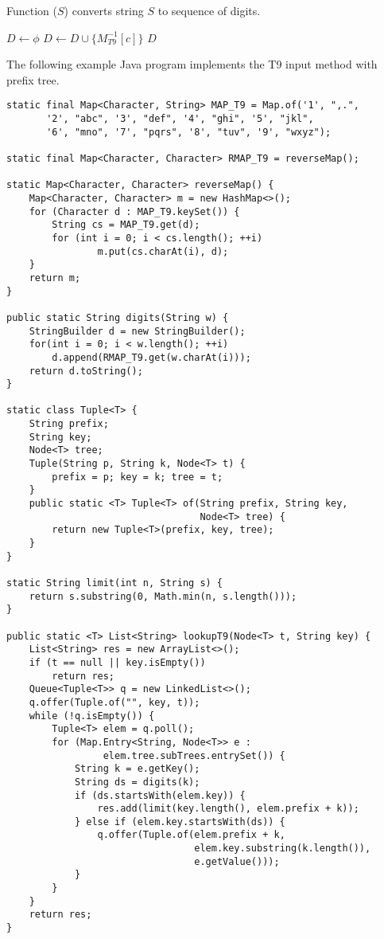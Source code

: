 \documentclass{article}
\begin{document}
Function ($S$) converts string $S$ to sequence of digits.

\begin{algorithmic}[1]
  \State $D \gets \phi$
    \State $D \gets D \cup \{M^{-1}_{T9}[c]\}$
  \EndFor
  \State \Return $D$
\EndFunction
\end{algorithmic}

The following example Java program implements the T9 input method with prefix tree.

\lstset{language=Java}
\begin{lstlisting}
static final Map<Character, String> MAP_T9 = Map.of('1', ",.",
       '2', "abc", '3', "def", '4', "ghi", '5', "jkl",
       '6', "mno", '7', "pqrs", '8', "tuv", '9', "wxyz");

static final Map<Character, Character> RMAP_T9 = reverseMap();

static Map<Character, Character> reverseMap() {
    Map<Character, Character> m = new HashMap<>();
    for (Character d : MAP_T9.keySet()) {
        String cs = MAP_T9.get(d);
        for (int i = 0; i < cs.length(); ++i)
                m.put(cs.charAt(i), d);
    }
    return m;
}

public static String digits(String w) {
    StringBuilder d = new StringBuilder();
    for(int i = 0; i < w.length(); ++i)
        d.append(RMAP_T9.get(w.charAt(i)));
    return d.toString();
}

static class Tuple<T> {
    String prefix;
    String key;
    Node<T> tree;
    Tuple(String p, String k, Node<T> t) {
        prefix = p; key = k; tree = t;
    }
    public static <T> Tuple<T> of(String prefix, String key,
                                  Node<T> tree) {
        return new Tuple<T>(prefix, key, tree);
    }
}

static String limit(int n, String s) {
    return s.substring(0, Math.min(n, s.length()));
}

public static <T> List<String> lookupT9(Node<T> t, String key) {
    List<String> res = new ArrayList<>();
    if (t == null || key.isEmpty())
        return res;
    Queue<Tuple<T>> q = new LinkedList<>();
    q.offer(Tuple.of("", key, t));
    while (!q.isEmpty()) {
        Tuple<T> elem = q.poll();
        for (Map.Entry<String, Node<T>> e :
                 elem.tree.subTrees.entrySet()) {
            String k = e.getKey();
            String ds = digits(k);
            if (ds.startsWith(elem.key)) {
                res.add(limit(key.length(), elem.prefix + k));
            } else if (elem.key.startsWith(ds)) {
                q.offer(Tuple.of(elem.prefix + k,
                                 elem.key.substring(k.length()),
                                 e.getValue()));
            }
        }
    }
    return res;
}
\end{lstlisting}
\end{document}
